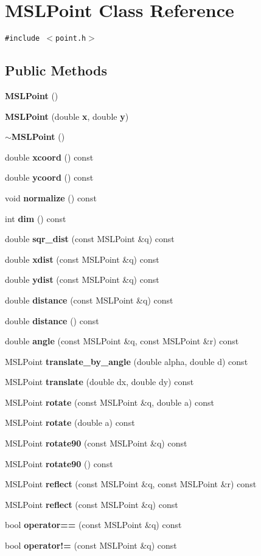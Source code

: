 \section{MSLPoint  Class Reference}
\label{classMSLPoint}
{\tt \#include $<$point.h$>$}

\subsection*{Public Methods}
\begin{CompactItemize}
\item 
{\bf MSLPoint} ()
\item 
{\bf MSLPoint} (double {\bf x}, double {\bf y})
\item 
{\bf $\sim$MSLPoint} ()
\item 
double {\bf xcoord} () const
\item 
double {\bf ycoord} () const
\item 
void {\bf normalize} () const
\item 
int {\bf dim} () const
\item 
double {\bf sqr\_\-dist} (const MSLPoint \&q) const
\item 
double {\bf xdist} (const MSLPoint \&q) const
\item 
double {\bf ydist} (const MSLPoint \&q) const
\item 
double {\bf distance} (const MSLPoint \&q) const
\item 
double {\bf distance} () const
\item 
double {\bf angle} (const MSLPoint \&q, const MSLPoint \&r) const
\item 
MSLPoint {\bf translate\_\-by\_\-angle} (double alpha, double d) const
\item 
MSLPoint {\bf translate} (double dx, double dy) const
\item 
MSLPoint {\bf rotate} (const MSLPoint \&q, double a) const
\item 
MSLPoint {\bf rotate} (double a) const
\item 
MSLPoint {\bf rotate90} (const MSLPoint \&q) const
\item 
MSLPoint {\bf rotate90} () const
\item 
MSLPoint {\bf reflect} (const MSLPoint \&q, const MSLPoint \&r) const
\item 
MSLPoint {\bf reflect} (const MSLPoint \&q) const
\item 
bool {\bf operator==} (const MSLPoint \&q) const
\item 
bool {\bf operator!=} (const MSLPoint \&q) const
\end{CompactItemize}

